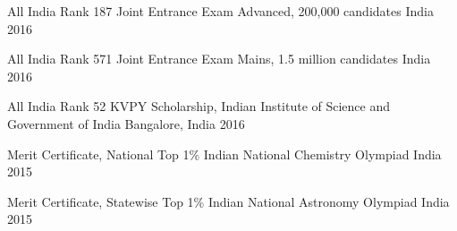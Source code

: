 
\begin{cvhonors}

  \cvhonor
    {All India Rank 187} %
    {Joint Entrance Exam Advanced, 200,000 candidates} %
    {India} %
    {2016} %

  \cvhonor
    {All India Rank 571} %
    {Joint Entrance Exam Mains, 1.5 million candidates} %
    {India} %
    {2016} %

  \cvhonor
    {All India Rank 52} %
    {KVPY Scholarship, Indian Institute of Science and Government of India} %
    {Bangalore, India} %
    {2016} %

  \cvhonor
    {Merit Certificate, National Top 1\%} %
    {Indian National Chemistry Olympiad} %
    {India} %
    {2015} %

  \cvhonor
    {Merit Certificate, Statewise Top 1\%} %
    {Indian National Astronomy Olympiad} %
    {India} %
    {2015} %

\end{cvhonors}
